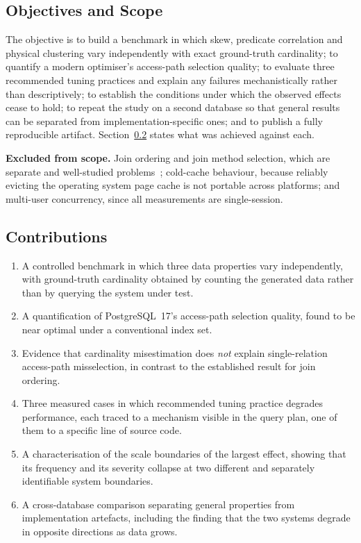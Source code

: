 \documentclass[12pt, a4paper]{article}
\begin{document}
\subsection{Objectives and Scope}

The objective is to build a benchmark in which skew, predicate
correlation and physical clustering vary independently with exact
ground-truth cardinality; to quantify a modern optimiser's access-path
selection quality; to evaluate three recommended tuning practices and
explain any failures mechanistically rather than descriptively; to
establish the conditions under which the observed effects cease to hold;
to repeat the study on a second database so that general results can be
separated from implementation-specific ones; and to publish a fully
reproducible artifact. Section~\ref{sec:contrib} states what was
achieved against each.

\noindent
\textbf{Excluded from scope.} Join ordering and join method selection,
which are separate and well-studied problems~\cite{leis2018query};
cold-cache behaviour, because reliably evicting the operating system
page cache is not portable across platforms; and multi-user concurrency,
since all measurements are single-session.

\subsection{Contributions}
\label{sec:contrib}

\begin{enumerate}[nosep]
\item A controlled benchmark in which three data properties vary
  independently, with ground-truth cardinality obtained by counting the
  generated data rather than by querying the system under test.
\item A quantification of PostgreSQL~17's access-path selection quality,
  found to be near optimal under a conventional index set.
\item Evidence that cardinality misestimation does \emph{not} explain
  single-relation access-path misselection, in contrast to the
  established result for join ordering.
\item Three measured cases in which recommended tuning practice degrades
  performance, each traced to a mechanism visible in the query plan, one
  of them to a specific line of source code.
\item A characterisation of the scale boundaries of the largest effect,
  showing that its frequency and its severity collapse at two different
  and separately identifiable system boundaries.
\item A cross-database comparison separating general properties from
  implementation artefacts, including the finding that the two systems
  degrade in opposite directions as data grows.
\end{enumerate}
\end{document}
